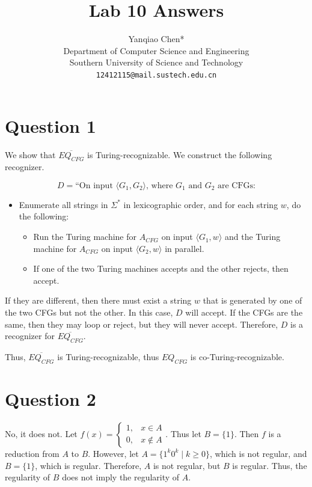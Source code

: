 \documentclass[a4paper, UTF-8]{article}
\theoremstyle{plain}
\begin{document}
\title{\bf{Lab 10 Answers}}
\author{Yanqiao Chen*\\ 
  Department of Computer Science and Engineering\\
  Southern University of Science and Technology\\
  \texttt{12412115@mail.sustech.edu.cn}
  }
\maketitle

\section{Question 1} 

We show that $\overline{EQ_{CFG}}$ is Turing-recognizable. We construct the following recognizer. 

$$
D = \text{``On input } \langle G_1, G_2 \rangle\text{, where } G_1 \text{ and } G_2 \text{ are CFGs:}
$$

\begin{itemize} 
  \item Enumerate all strings in $\Sigma^*$ in lexicographic order, and for each string $w$, do the following:
  \begin{itemize}
    \item Run the Turing machine for $A_{CFG}$ on input $\langle G_1, w \rangle$ and the Turing machine for $A_{CFG}$ on input $\langle G_2, w \rangle$ in parallel. 
    \item If one of the two Turing machines accepts and the other rejects, then accept.
  \end{itemize} 
\end{itemize}

If they are different, then there must exist a string $w$ that is generated by one of the two CFGs but not the other. In this case, $D$ will accept. If the CFGs are the same, then they may loop or reject, but they will never accept. Therefore, $D$ is a recognizer for $\overline{EQ_{CFG}}$.

Thus, $\overline{EQ_{CFG}}$ is Turing-recognizable, thus $EQ_{CFG}$ is co-Turing-recognizable.

\section{Question 2} 

No, it does not. Let $f(x) = \begin{cases} 1, & x\in A \\ 0, & x\notin A\end{cases}$. Thus let $B = \{1\}$. Then $f$ is a reduction from $A$ to $B$. However, let $A = \{1^k0^k \mid k \geq 0\}$, which is not regular, and $B = \{1\}$, which is regular. Therefore, $A$ is not regular, but $B$ is regular. Thus, the regularity of $B$ does not imply the regularity of $A$.
\end{document}
